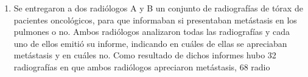 \begin{enumerate}[leftmargin=*]


\item Se entregaron a dos radiólogos A y B un conjunto de radiografías de tórax de pacientes oncológicos, para que
informaban si presentaban metástasis en los pulmones o no. Ambos radiólogos analizaron todas las radiografías y cada uno
de ellos emitió su informe, indicando en cuáles de ellas se apreciaban metástasis y en cuáles no. Como resultado de
dichos informes hubo 32 radiografías en que ambos radiólogos apreciaron metástasis, 68 radio
\end{enumerate}
